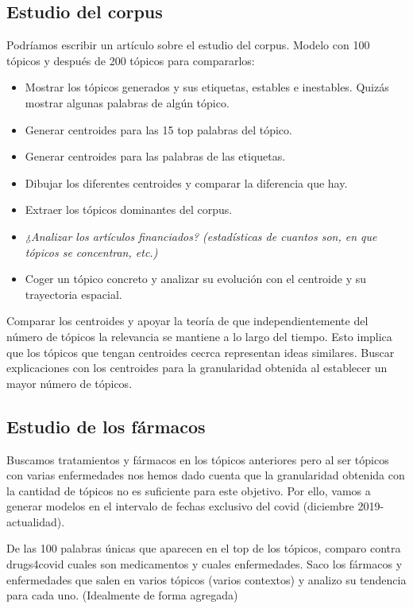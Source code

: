 \documentclass[a4paper,10pt]{article}
\begin{document}
\subsection{Estudio del corpus}
Podríamos escribir un artículo sobre el estudio del corpus. Modelo con 100 tópicos y después de 200 tópicos para compararlos:
\begin{itemize}
	\item Mostrar los tópicos generados y sus etiquetas, estables e inestables. Quizás mostrar algunas palabras de algún tópico. 
	\item Generar centroides para las 15 top palabras del tópico.
	\item Generar centroides para las palabras de las etiquetas.
	\item Dibujar los diferentes centroides y comparar la diferencia que hay.
	\item Extraer los tópicos dominantes del corpus.
	\item \textit{¿Analizar los artículos financiados? (estadísticas de cuantos son, en que tópicos se concentran, etc.)}
	\item Coger un tópico concreto y analizar su evolución con el centroide y su trayectoria espacial.
\end{itemize}

Comparar los centroides y apoyar la teoría de que independientemente del número de tópicos la relevancia se mantiene a lo largo del tiempo. Esto implica que los tópicos que tengan centroides cecrca representan ideas similares. Buscar explicaciones con los centroides para la granularidad obtenida al establecer un mayor número de tópicos.

\subsection{Estudio de los fármacos}
Buscamos tratamientos y fármacos en los tópicos anteriores pero al ser tópicos con varias enfermedades nos hemos dado cuenta que la granularidad obtenida con la cantidad de tópicos no es suficiente para este objetivo. Por ello, vamos a generar modelos en el intervalo de fechas exclusivo del covid (diciembre 2019-actualidad).

De las 100 palabras únicas que aparecen en el top de los tópicos, comparo contra drugs4covid cuales son medicamentos y cuales enfermedades. Saco los fármacos y enfermedades que salen en varios tópicos (varios contextos) y analizo su tendencia para cada uno. (Idealmente de forma agregada)
\end{document}
